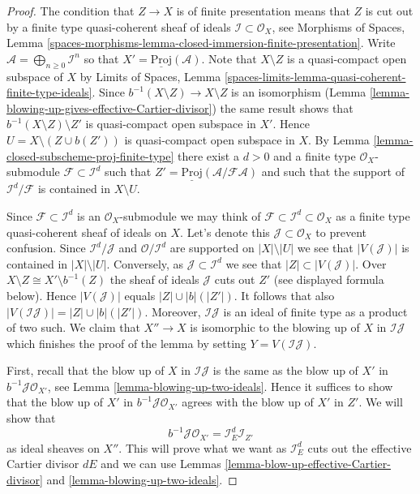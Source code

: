 \begin{proof}
The condition that $Z \to X$ is of finite presentation means that
$Z$ is cut out by a finite type quasi-coherent sheaf of ideals
$\mathcal{I} \subset \mathcal{O}_X$, see
Morphisms of Spaces, Lemma
\ref{spaces-morphisms-lemma-closed-immersion-finite-presentation}.
Write $\mathcal{A} = \bigoplus_{n \geq 0} \mathcal{I}^n$ so that
$X' = \underline{\text{Proj}}(\mathcal{A})$.
Note that $X \setminus Z$ is a quasi-compact open subspace of $X$ by
Limits of Spaces, Lemma
\ref{spaces-limits-lemma-quasi-coherent-finite-type-ideals}.
Since $b^{-1}(X \setminus Z) \to X \setminus Z$ is an isomorphism
(Lemma \ref{lemma-blowing-up-gives-effective-Cartier-divisor}) the same
result shows that
$b^{-1}(X \setminus Z) \setminus Z'$ is quasi-compact open subspace in $X'$.
Hence $U = X \setminus (Z \cup b(Z'))$ is quasi-compact open subspace in $X$.
By Lemma \ref{lemma-closed-subscheme-proj-finite-type}
there exist a $d > 0$ and a finite type
$\mathcal{O}_X$-submodule $\mathcal{F} \subset \mathcal{I}^d$ such
that $Z' = \underline{\text{Proj}}(\mathcal{A}/\mathcal{F}\mathcal{A})$
and such that the support of $\mathcal{I}^d/\mathcal{F}$ is contained
in $X \setminus U$.

\medskip\noindent
Since $\mathcal{F} \subset \mathcal{I}^d$ is an $\mathcal{O}_X$-submodule
we may think of $\mathcal{F} \subset \mathcal{I}^d \subset \mathcal{O}_X$
as a finite type quasi-coherent sheaf of ideals on $X$. Let's denote this
$\mathcal{J} \subset \mathcal{O}_X$ to prevent confusion. Since
$\mathcal{I}^d / \mathcal{J}$ and $\mathcal{O}/\mathcal{I}^d$ are
supported on $|X| \setminus |U|$ we see that $|V(\mathcal{J})|$ is contained
in $|X| \setminus |U|$. Conversely, as $\mathcal{J} \subset \mathcal{I}^d$
we see that $|Z| \subset |V(\mathcal{J})|$. Over
$X \setminus Z \cong X' \setminus b^{-1}(Z)$ the sheaf of ideals
$\mathcal{J}$ cuts out $Z'$ (see displayed formula below). Hence
$|V(\mathcal{J})|$ equals $|Z| \cup |b|(|Z'|)$. It follows that also
$|V(\mathcal{I}\mathcal{J})| = |Z| \cup |b|(|Z'|)$. Moreover,
$\mathcal{I}\mathcal{J}$ is an ideal of finite type as a product of two such.
We claim that $X'' \to X$ is isomorphic to the blowing up of $X$ in
$\mathcal{I}\mathcal{J}$ which finishes the proof of the lemma by setting
$Y = V(\mathcal{I}\mathcal{J})$.

\medskip\noindent
First, recall that the blow up of $X$ in $\mathcal{I}\mathcal{J}$
is the same as the blow up of $X'$ in $b^{-1}\mathcal{J} \mathcal{O}_{X'}$,
see Lemma \ref{lemma-blowing-up-two-ideals}.
Hence it suffices to show that the blow up of $X'$ in
$b^{-1}\mathcal{J} \mathcal{O}_{X'}$ agrees with the blow up of $X'$
in $Z'$. We will show that
$$
b^{-1}\mathcal{J} \mathcal{O}_{X'} = \mathcal{I}_E^d \mathcal{I}_{Z'}
$$
as ideal sheaves on $X''$. This will prove what we want as
$\mathcal{I}_E^d$ cuts out the effective Cartier divisor $dE$
and we can use Lemmas \ref{lemma-blow-up-effective-Cartier-divisor} and
\ref{lemma-blowing-up-two-ideals}.


\end{proof}
